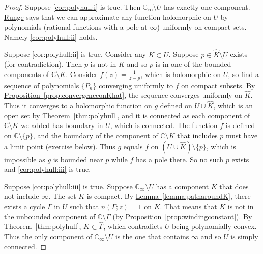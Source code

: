 \documentclass[12pt,openany]{book}
\newcommand{\C}{{\mathbb{C}}}
\theoremstyle{plain}
\theoremstyle{remark}
\theoremstyle{definition}
\theoremstyle{exercise}
\theoremstyle{example}
\newcommand{\thmref}[1]{\hyperref[#1]{Theorem~\ref*{#1}}}
\newcommand{\propref}[1]{\hyperref[#1]{Proposition~\ref*{#1}}}
\newcommand{\lemmaref}[1]{\hyperref[#1]{Lemma~\ref*{#1}}}
\begin{document}
\begin{proof}
Suppose \ref{cor:polyhull:i} is true.
Then $\C_\infty \setminus U$ has exactly one component.
\hyperref[cor:rungeseq]{Runge} says that we can approximate any function
holomorphic on $U$ by polynomials
(rational functions with a pole at $\infty$) uniformly on compact sets.
Namely \ref{cor:polyhull:ii} holds.

Suppose \ref{cor:polyhull:ii} is true.
Consider any $K \subset U$.  Suppose $p \in \widehat{K} \setminus U$ exists
(for contradiction).
Then $p$ is not in $K$ and so $p$ is in one of the bounded components of $\C \setminus K$.
Consider $f(z) = \frac{1}{z-p}$, which is holomorphic on $U$, so find
a sequence of polynomials $\{ P_n \}$ converging uniformly to $f$ on compact
subsets.
By \propref{prop:convergenceonKhat},
the sequence converges uniformly on $\widehat{K}$.
Thus it converges to a holomorphic function on
$g$ defined on $U \cup \widehat{K}$, which is an open set by
\thmref{thm:polyhull}, and it is connected as each component of $\C \setminus K$ we added
has boundary in $U$, which is connected.
The function $f$ is defined on $\C \setminus \{ p \}$,
and the boundary of the component of $\C \setminus K$ that includes $p$ must
have a limit point (exercise below).
Thus $g$ equals $f$ on $(U \cup \widehat{K}) \setminus \{ p \}$, which is
impossible as $g$ is bounded near $p$ while $f$ has a pole there.  So no
such $p$ exists and \ref{cor:polyhull:iii} is true.

Suppose \ref{cor:polyhull:iii} is true.  Suppose $\C_\infty \setminus U$
has a component $K$ that does not include $\infty$.  The set $K$ is compact.
By \lemmaref{lemma:patharoundK}, there exists a cycle $\Gamma$ 
in $U$ such that $n(\Gamma;z) = 1$ on $K$.  That means that $K$ is
not in the unbounded component of $\C \setminus \Gamma$ (by
\propref{prop:windingconstant}).  By \thmref{thm:polyhull},
$K \subset \widehat{\Gamma}$,
which contradicts $U$ being polynomially convex.  Thus the only component of $\C_\infty
\setminus U$ is the one that contains $\infty$ and so $U$ is simply
connected.
\end{proof}
\end{document}
